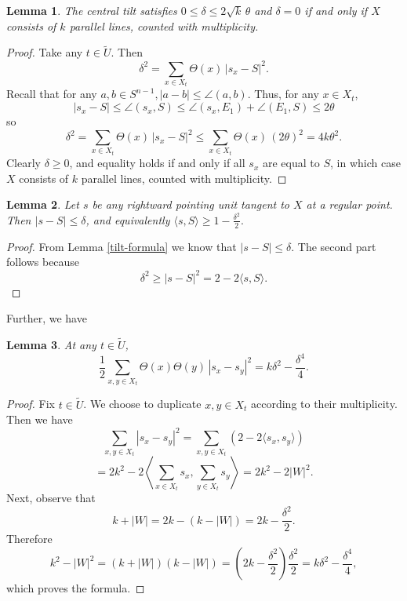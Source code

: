 \documentclass[11pt,reqno,twoside]{amsart}
\newtheorem{lemma}{Lemma}
\theoremstyle{definition}
\begin{document}
\begin{lemma} \label{central-tilt-equivalence}
    The central tilt satisfies $0 \leq \delta \leq 2\sqrt{k} \, \theta$ and $\delta = 0$ if and only if $X$ consists of $k$ parallel lines, counted with multiplicity.
\end{lemma}

\begin{proof}
Take any $t \in \tilde U$. Then 
\[\delta^2 = \sum_{x \in X_t} \Theta(x) \, |s_x - S|^2. \]
Recall that for any $a,b \in S^{n-1}, |a-b| \leq \angle(a,b).$ Thus, for any $x \in X_t$,
\[|s_x-S| \leq \angle(s_x,S) \leq \angle(s_x,E_1) + \angle(E_1,S) \leq 2\theta\]
so 
\[\delta^2 = \sum_{x \in X_t} \Theta(x) \, |s_x - S|^2 \leq \sum_{x \in X_t} \Theta(x) \, (2\theta)^2 = 4k\theta^2.\]
Clearly $\delta \geq 0$, and equality holds if and only if all $s_x$ are equal to $S$, in which case $X$ consists of $k$ parallel lines, counted with multiplicity.
\end{proof}

\begin{lemma}
    Let $s$ be any rightward pointing unit tangent to $X$ at a regular point. Then $|s-S| \leq \delta$, and equivalently $\langle s,S\rangle \geq 1 - \frac{\delta^2}{2}.$
\end{lemma}
\begin{proof}
From Lemma \ref{tilt-formula} we know that $|s - S| \leq \delta$. The second part follows because
\[\delta^2 \geq |s-S|^2 = 2-2\langle s,S\rangle.\]
\end{proof}

Further, we have

\begin{lemma} \label{spread-formula}
    At any $t \in \tilde U$,
    \[\frac{1}{2} \sum_{x,y \in X_t} \Theta(x) \Theta(y) \, |s_x-s_y|^2 = k \delta^2- \frac{\delta^4}{4}.\]
\end{lemma}
\begin{proof}
    Fix $t \in \tilde U$. We choose to duplicate $x,y \in X_t$ according to their multiplicity. Then we have
    \[\sum_{x,y \in X_t} |s_x-s_y|^2 = \sum_{x,y \in X_t} (2 - 2\langle s_x,s_y\rangle)\]
    \[= 2k^2 - 2 \left\langle \sum_{x \in X_t} s_x, \sum_{y \in X_t}s_y\right\rangle = 2k^2 - 2|W|^2.\]
    Next, observe that
    \[k+|W| = 2k - (k-|W|) = 2k - \frac{\delta^2}{2}.\]
    Therefore
    \[k^2 - |W|^2 = (k+|W|)(k-|W|) = \left(2k - \frac{\delta^2}{2}\right)\frac{\delta^2}{2} = k \delta^2 - \frac{\delta^4}{4},\] which proves the formula.
\end{proof}
\end{document}
